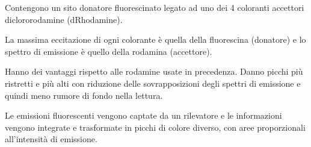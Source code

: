 \documentclass[]{article}
\begin{document}
Contengono un sito donatore fluorescinato legato ad uno dei 4 coloranti
accettori diclororodamine (dRhodamine).

La massima eccitazione di ogni colorante è quella della fluorescina
(donatore) e lo spettro di emissione è quello della rodamina
(accettore).

Hanno dei vantaggi rispetto alle rodamine usate in precedenza. Danno
picchi più ristretti e più alti con riduzione delle sovrapposizioni
degli spettri di emissione e quindi meno rumore di fondo nella lettura.

Le emissioni fluorescenti vengono captate da un rilevatore e le
informazioni vengono integrate e trasformate in picchi di colore
diverso, con aree proporzionali all'intensità di emissione.
\end{document}
